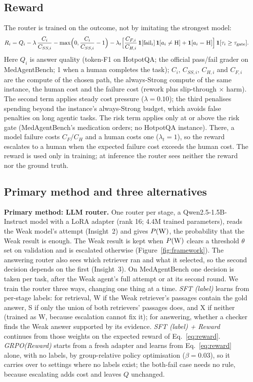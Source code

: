 \documentclass{article}
\newcommand{\W}{\textsc{W}}
\newcommand{\Sg}{\textsc{S}}
\newcommand{\Hm}{\textsc{H}}
\begin{document}
\subsection{Reward}
\label{sec:reward}
The router is trained on the outcome, not by imitating the strongest model:
\begin{equation}
R_i = Q_i - \lambda\,\frac{C_i}{C_{SS,i}} - \max\!\Big(0, \frac{C_i}{C_{SS,i}} - 1\Big) - \lambda_t\Big[\frac{C_{F,i}}{C_{H,i}}\,\ind[\text{fail}_i]\,\ind[a_i\neq \Hm] + \ind[a_i = \Hm]\Big]\,\ind[\tau_i \ge \tau_{\text{gate}}].
\label{eq:reward}
\end{equation}
Here $Q_i$ is answer quality (token-F1 on HotpotQA; the official pass/fail grader on MedAgentBench; 1 when a human completes the task); $C_i$, $C_{SS,i}$, $C_{H,i}$ and $C_{F,i}$ are the compute of the chosen path, the always-Strong compute of the same instance, the human cost and the failure cost (rework plus slip-through $\times$ harm). The second term applies steady cost pressure ($\lambda{=}0.10$); the third penalises spending beyond the instance's always-Strong budget, which avoids false penalties on long agentic tasks. The risk term applies only at or above the risk gate (MedAgentBench's medication orders; no HotpotQA instance). There, a model failure costs $C_F/C_H$ and a human costs one ($\lambda_t{=}1$), so the reward escalates to a human when the expected failure cost exceeds the human cost. The reward is used only in training; at inference the router sees neither the reward nor the ground truth.

\subsection{Primary method and three alternatives}
\label{sec:families}

\textbf{Primary method: LLM router.} One router per stage, a Qwen2.5-1.5B-Instruct model with a LoRA adapter \citep{hu2022lora} (rank 16; 4.4M trained parameters), reads the Weak model's attempt (Insight~2) and gives $P(\W)$, the probability that the Weak result is enough. The Weak result is kept when $P(\W)$ clears a threshold $\theta$ set on validation and is escalated otherwise (Figure~\ref{fig:framework}). The answering router also sees which retriever ran and what it selected, so the second decision depends on the first (Insight~3). On MedAgentBench one decision is taken per task, after the Weak agent's full attempt or at its second round. We train the router three ways, changing one thing at a time. \emph{SFT (label)} learns from per-stage labels: for retrieval, \W{} if the Weak retriever's passages contain the gold answer, \Sg{} if only the union of both retrievers' passages does, and X if neither (trained as \W, because escalation cannot fix it); for answering, whether a checker finds the Weak answer supported by its evidence. \emph{SFT (label) + Reward} continues from those weights on the expected reward of Eq.~\ref{eq:reward}. \emph{GRPO(Reward)} starts from a fresh adapter and learns from Eq.~\ref{eq:reward} alone, with no labels, by group-relative policy optimisation \citep{shao2024deepseekmath} ($\beta{=}0.03$), so it carries over to settings where no labels exist; the both-fail case needs no rule, because escalating adds cost and leaves $Q$ unchanged.
\end{document}
